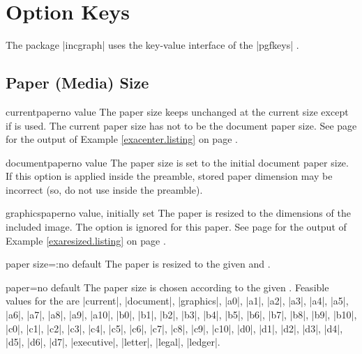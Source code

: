 \documentclass[a4paper,11pt]{ltxdoc}
\begin{document}
\clearpage
\section{Option Keys}\label{sec:keys}
The package |incgraph| uses the key-value interface of
the |pgfkeys| \cite{package:tikz}.

\subsection{Paper (Media) Size}\label{sec:papersize}

\begin{docIgrKey}{currentpaper}{}{no value}
  The paper size keeps unchanged at the current size
  except if  is used.
  The current paper size has not to
  be the document paper size.
  See page \pageref{exacenter} for the output
  of Example \ref{exacenter.listing} on page \pageref{exacenter.listing}.
\end{docIgrKey}

\begin{docIgrKey}{documentpaper}{}{no value}
  The paper size is set to the initial document paper size.
  If this option is applied inside the preamble, stored paper dimension may be
  incorrect (so, do not use inside the preamble).
\end{docIgrKey}

\begin{docIgrKey}{graphicspaper}{}{no value, initially set}
  The paper is resized to the dimensions of the included image.
  The  option is ignored for this paper.
  See page \pageref{exaresized} for the output
  of Example \ref{exaresized.listing} on page \pageref{exaresized.listing}.
\end{docIgrKey}


\begin{docIgrKey}{paper size}{=:}{no default}
  The paper is resized to the given  and .
\end{docIgrKey}

\begin{docIgrKey}{paper}{=}{no default}
  The paper size is chosen according to the given .
  Feasible values for the  are
  |current|, |document|, |graphics|,
  |a0|, |a1|, |a2|, |a3|, |a4|, |a5|, |a6|, |a7|, |a8|, |a9|, |a10|,
  |b0|, |b1|, |b2|, |b3|, |b4|, |b5|, |b6|, |b7|, |b8|, |b9|, |b10|,
  |c0|, |c1|, |c2|, |c3|, |c4|, |c5|, |c6|, |c7|, |c8|, |c9|, |c10|,
  |d0|, |d1|, |d2|, |d3|, |d4|, |d5|, |d6|, |d7|,
  |executive|, |letter|, |legal|, |ledger|.
\end{docIgrKey}
\end{document}
